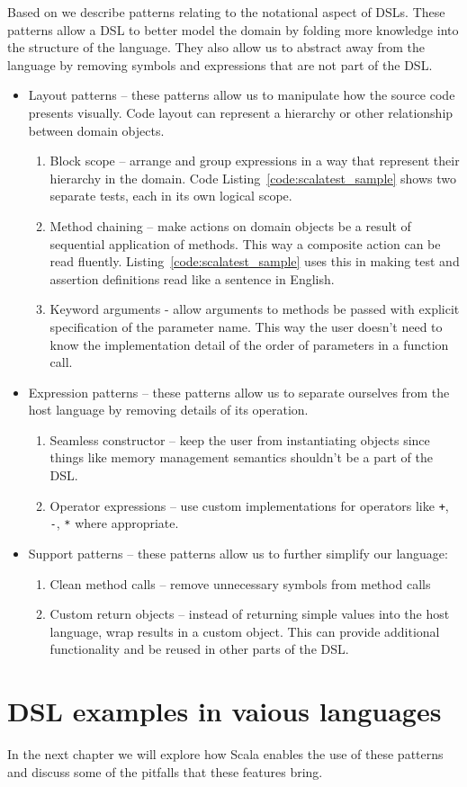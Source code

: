 Based on \autocite{Gunther:2011} we describe patterns relating to the notational aspect of DSLs.
These patterns allow a DSL to better model the domain by folding more knowledge into the structure of the language.
They also allow us to abstract away from the language by removing symbols and expressions that are not part of the DSL.

\begin{itemize}
	\item Layout patterns -- these patterns allow us to manipulate how the source code presents visually.
Code layout can represent a hierarchy or other relationship between domain objects.
	\begin{enumerate}
		\item Block scope -- arrange and group expressions in a way that represent their hierarchy in the domain.
Code Listing~\ref{code:scalatest_sample} shows two separate tests, each in its own logical scope.
		\item Method chaining -- make actions on domain objects be a result of sequential application of methods.
This way a composite action can be read fluently.
Listing~\ref{code:scalatest_sample} uses this in making test and assertion definitions read like a sentence in English.
		\item Keyword arguments - allow arguments to methods be passed with explicit specification of the parameter name.
This way the user doesn't need to know the implementation detail of the order of parameters in a function call.
	\end{enumerate}
	\item Expression patterns -- these patterns allow us to separate ourselves from the host language by removing details of its operation.
	\begin{enumerate}
		\item Seamless constructor -- keep the user from instantiating objects since things like memory management semantics shouldn't be a part of the DSL.
		\item Operator expressions -- use custom implementations for operators like \texttt{+}, \texttt{-}, \texttt{*} where appropriate.
	\end{enumerate}
	\item Support patterns -- these patterns allow us to further simplify our language:
	\begin{enumerate}
		\item Clean method calls -- remove unnecessary symbols from method calls
		\item Custom return objects -- instead of returning simple values into the host language, wrap results in a custom object.
This can provide additional functionality and be reused in other parts of the DSL.
	\end{enumerate}
\end{itemize}

\section{DSL examples in vaious languages}



In the next chapter we will explore how Scala enables the use of these patterns and discuss some of the pitfalls that these features bring.
